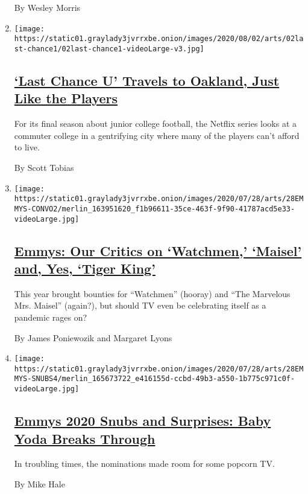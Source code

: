 \begin{enumerate}
  By Wesley Morris
\item
  \texttt{[image: https://static01.graylady3jvrrxbe.onion/images/2020/08/02/arts/02last-chance1/02last-chance1-videoLarge-v3.jpg]}

  \hypertarget{last-chance-u-travels-to-oakland-just-like-the-players}{%
  \subsection{\texorpdfstring{\href{/2020/07/28/arts/television/last-chance-u-season-5.html}{`Last
  Chance U' Travels to Oakland, Just Like the
  Players}}{`Last Chance U' Travels to Oakland, Just Like the Players}}\label{last-chance-u-travels-to-oakland-just-like-the-players}}

  For its final season about junior college football, the Netflix series
  looks at a commuter college in a gentrifying city where many of the
  players can't afford to live.

  By Scott Tobias
\item
  \texttt{[image: https://static01.graylady3jvrrxbe.onion/images/2020/07/28/arts/28EMMYS-CONVO2/merlin\_163951620\_f1b96611-35ce-463f-9f90-41787acd5e33-videoLarge.jpg]}

  \hypertarget{emmys-our-critics-on-watchmen-maisel-and-yes-tiger-king}{%
  \subsection{\texorpdfstring{\href{/2020/07/28/arts/television/emmys-watchmen-handmaids-tale-tiger-king.html}{Emmys:
  Our Critics on `Watchmen,' `Maisel' and, Yes, `Tiger
  King'}}{Emmys: Our Critics on `Watchmen,' `Maisel' and, Yes, `Tiger King'}}\label{emmys-our-critics-on-watchmen-maisel-and-yes-tiger-king}}

  This year brought bounties for ``Watchmen'' (hooray) and ``The
  Marvelous Mrs. Maisel'' (again?), but should TV even be celebrating
  itself as a pandemic rages on?

  By James Poniewozik and Margaret Lyons
\item
  \texttt{[image: https://static01.graylady3jvrrxbe.onion/images/2020/07/28/arts/28EMMYS-SNUBS4/merlin\_165673722\_e416155d-ccbd-49b3-a550-1b775c971c0f-videoLarge.jpg]}

  \hypertarget{emmys-2020-snubs-and-surprises-baby-yoda-breaks-through}{%
  \subsection{\texorpdfstring{\href{/2020/07/28/arts/television/emmys-snubs-mandalorian-zendaya-reese.html}{Emmys
  2020 Snubs and Surprises: Baby Yoda Breaks
  Through}}{Emmys 2020 Snubs and Surprises: Baby Yoda Breaks Through}}\label{emmys-2020-snubs-and-surprises-baby-yoda-breaks-through}}

  In troubling times, the nominations made room for some popcorn TV.

  By Mike Hale
\end{enumerate}

